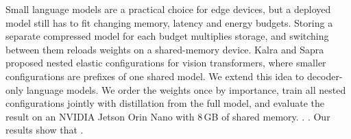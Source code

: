 Small language models are a practical choice for edge devices, but a deployed model still has to fit changing memory, latency and energy budgets. Storing a separate compressed model for each budget multiplies storage, and switching between them reloads weights on a shared-memory device. Kalra and Sapra~\cite{kalra2025elastoformer} proposed nested elastic configurations for vision transformers, where smaller configurations are prefixes of one shared model. We extend this idea to decoder-only language models. We order the weights once by importance, train all nested configurations jointly with distillation from the full model, and evaluate the result on an NVIDIA Jetson Orin Nano with 8\,GB of shared memory. . . Our results show that .
